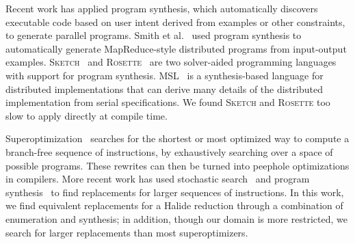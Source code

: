 Recent work has applied program synthesis, which automatically discovers executable code based on user intent derived from examples or other constraints, to generate parallel programs. Smith et al.~\cite{Smith:2016:MPS:2908080.2908102} used program synthesis to automatically generate MapReduce-style distributed programs from input-output examples. \textsc{Sketch}~\cite{Solar-Lezama:2008:PSS:1714168} and \textsc{Rosette}~\cite{Torlak:2013:GSL:2509578.2509586} are two solver-aided programming languages with support for program synthesis.  MSL~\cite{Xu:2014:MSE:2683593.2683628} is a synthesis-based language for distributed implementations that can derive many details of the distributed implementation from serial specifications. We found \textsc{Sketch} and \textsc{Rosette} too slow to apply directly at compile time.

Superoptimization~\cite{Granlund:1992:EBU:143095.143146, Massalin:1987:SLS:36206.36194} searches for the shortest or most optimized way to compute a branch-free sequence of instructions, by exhaustively searching over a space of possible programs. These rewrites can then be turned into peephole optimizations in compilers. More recent work has used stochastic search~\cite{Phothilimthana:2016:SUS:2872362.2872387, Schkufza:2013:SS:2490301.2451150} and program synthesis~\cite{Lopes:2015:PCP:2737924.2737965} to find replacements for larger sequences of instructions.
In this work, we find equivalent replacements for a Halide reduction through a combination of enumeration and synthesis; in addition, though our domain is more restricted, we search for larger replacements than most superoptimizers.
